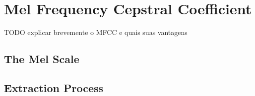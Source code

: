 \section{Mel Frequency Cepstral Coefficient}

TODO explicar brevemente o MFCC e quais suas vantagens


\subsection{The Mel Scale}


\subsection{Extraction Process}